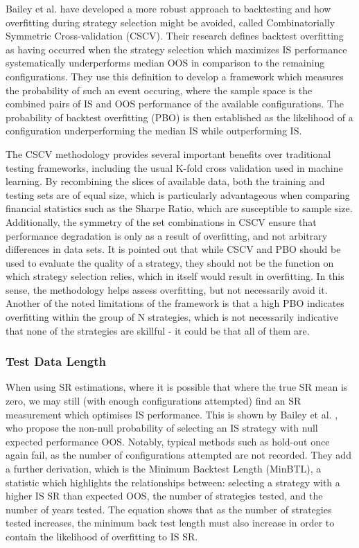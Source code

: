 \documentclass[a4paper,11pt,oneside]{article}
\theoremstyle{plain}
\theoremstyle{definition}
\begin{document}
	Bailey et al. \cite{BailyPBO} have developed a more robust approach to backtesting and how overfitting during strategy 
	selection might be avoided, called Combinatorially Symmetric Cross-validation (CSCV). Their research defines backtest overfitting as having occurred when the strategy selection which maximizes IS performance systematically underperforms median OOS in comparison to the remaining configurations. They use this definition to develop a framework which measures the probability of such an event occuring, where the sample space is the combined pairs of IS and OOS performance of the available configurations. The probability of backtest overfitting (PBO) is then established as the likelihood of a configuration underperforming the median IS while outperforming IS. 
	\hfill \break 
	
	The CSCV methodology provides several important benefits over traditional testing 
	frameworks, including the usual K-fold cross validation used in machine learning. By recombining the slices of 
	available data, both the training and testing sets are of equal size, which is particularly advantageous when comparing 
	financial statistics such as the Sharpe Ratio, which are susceptible to sample size. Additionally, the symmetry 
	of the set combinations in CSCV ensure that performance degradation is only as a result of overfitting, and not 
	arbitrary differences in data sets. It is pointed out that while CSCV and PBO should be used to evaluate the quality 
	of a strategy, they should not be the function on which strategy selection relies, which in itself would result in overfitting. In this sense, the methodology helps assess overfitting, but not necessarily avoid it. Another of the noted limitations of the framework is 
	that a high PBO indicates overfitting within the group of N strategies, which is not necessarily indicative that none 
	of the strategies are skillful - it could be that all of them are. 
	\hfill \break 
	
	\subsubsection{Test Data Length}

	When using SR estimations, where it is possible that where the true SR mean is 
	zero, we may still (with enough configurations attempted) find an SR measurement which optimises IS performance. 
	This is shown by Bailey et al. \cite{BaileyBTL}, who propose the non-null probability of selecting an IS strategy with null expected 
	performance OOS. Notably, typical methods such as hold-out once again fail, as the number of configurations 
	attempted are not recorded. They add a further derivation, which is the Minimum Backtest Length (MinBTL), a statistic which highlights the relationships between: selecting a strategy with a higher IS SR than expected OOS, 
	the number of strategies tested, and the number of years tested. The equation shows that  as the number 
	of strategies tested increases, the minimum back test length must also increase in order to contain the likelihood 
	of overfitting to IS SR. 
	\hfill \break 
	
\end{document}
